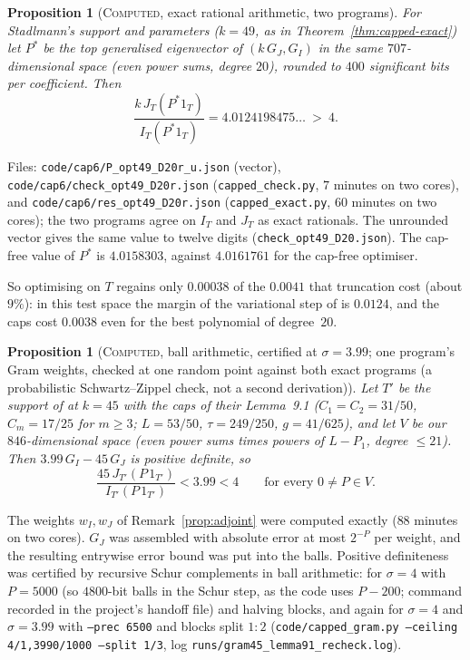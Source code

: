 \documentclass[11pt]{amsart}
\newtheorem{proposition}[theorem]{Proposition}
\theoremstyle{definition}
\theoremstyle{remark}
\newcommand{\lbl}[1]{\textup{\textsc{#1}}}
\begin{document}
\begin{proposition}[\lbl{Computed}, exact rational arithmetic, two programs]\label{prop:opt49}
For Stadlmann's support and parameters ($k=49$, as in
Theorem~\ref{thm:capped-exact}) let $P^\ast$ be the top generalised
eigenvector of $(k\,G_J,G_I)$ in the same $707$-dimensional space (even
power sums, degree $20$), rounded to $400$ significant bits per
coefficient. Then
\[
\frac{k\,J_T(P^\ast1_T)}{I_T(P^\ast1_T)}=4.0124198475\ldots\ >\ 4 .
\]
\end{proposition}
\begin{sloppypar}
Files: \texttt{code/cap6/P\_opt49\_D20r\_u.json} (vector),
\texttt{code/cap6/check\_opt49\_D20r.json} (\texttt{capped\_check.py}, $7$
minutes on two cores), and \texttt{code/cap6/res\_opt49\_D20r.json} (\texttt{capped\_exact.py}, $60$ minutes on two cores); the two programs agree on $I_T$ and $J_T$ as exact rationals. The unrounded vector gives the same value to
twelve digits (\texttt{check\_opt49\_D20.json}). The cap-free value of
$P^\ast$ is $4.0158303$, against $4.0161761$ for the cap-free optimiser.
\end{sloppypar}
So optimising on $T$ regains only $0.00038$ of the $0.0041$ that truncation
cost (about $9\%$): in this test space the margin of the variational step of
\cite{Sta26} is $0.0124$, and the caps cost $0.0038$ even for the best
polynomial of degree~$20$.

\begin{proposition}[\lbl{Computed}, ball arithmetic, certified at $\sigma=3.99$; one program's Gram weights, checked at one random point against both exact programs (a probabilistic Schwartz--Zippel check, not a second derivation)]\label{prop:cha-ceiling}
Let $T'$ be the support of \cite{Cha26} at $k=45$ with the caps of their
Lemma~9.1 ($C_1=C_2=31/50$, $C_m=17/25$ for $m\ge3$; $L=53/50$,
$\tau=249/250$, $g=41/625$), and let $V$ be our $846$-dimensional space
(even power sums times powers of $L-P_1$, degree $\le21$). Then
$3.99\,G_I-45\,G_J$ is positive definite, so
\[
\frac{45\,J_{T'}(P\,1_{T'})}{I_{T'}(P\,1_{T'})}<3.99<4\qquad\text{for every }0\ne P\in V .
\]
\end{proposition}
\begin{sloppypar}
The weights $w_I,w_J$ of Remark~\ref{prop:adjoint} were computed exactly
($88$ minutes on two cores). $G_J$ was assembled with absolute
error at most $2^{-P}$ per weight, and the resulting entrywise error bound was
put into the balls. Positive definiteness was certified by recursive Schur
complements in ball arithmetic: for $\sigma=4$ with $P=5000$ (so $4800$-bit
balls in the Schur step, as the code uses $P-200$; command recorded in the
project's handoff file) and halving blocks, and again for
$\sigma=4$ and $\sigma=3.99$ with \texttt{--prec 6500} and blocks split $1:2$
(\texttt{code/capped\_gram.py --ceiling 4/1,3990/1000 --split 1/3}, log
\texttt{runs/gram45\_lemma91\_recheck.log}).
\end{sloppypar}
\end{document}
